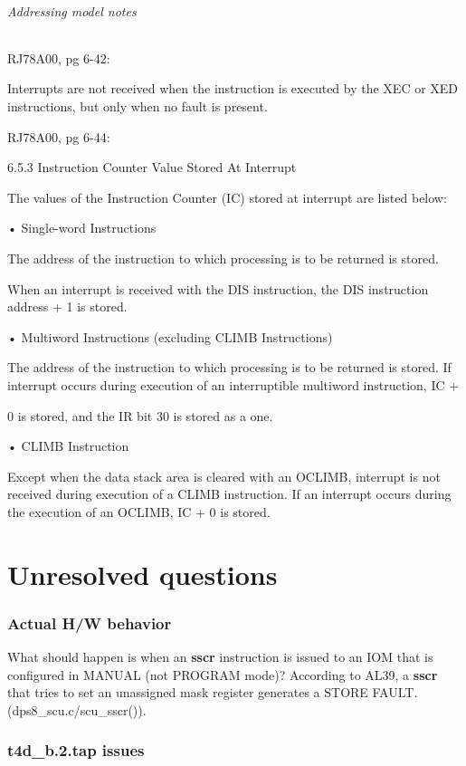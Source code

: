 \documentclass[notitlepage]{report}
\begin{document}
\paragraph{Addressing model notes}

RJ78A00, pg 6-42:

Interrupts are not received when the instruction is executed by the XEC or XED
instructions, but only when no fault is present.

RJ78A00, pg 6-44:

6.5.3 Instruction Counter Value Stored At Interrupt

The values of the Instruction Counter (IC) stored at interrupt are listed below: 

• Single-word Instructions

The address of the instruction to which processing is to be returned is stored.

When an interrupt is received with the DIS instruction, the DIS instruction
address + 1 is stored.

• Multiword Instructions (excluding CLIMB Instructions)

The address of the instruction to which processing is to be returned is stored. If
interrupt occurs during execution of an interruptible multiword instruction, IC +

0 is stored, and the IR bit 30 is stored as a one.

• CLIMB Instruction

Except when the data stack area is cleared with an OCLIMB, interrupt is not
received during execution of a CLIMB instruction. If an interrupt occurs
during the execution of an OCLIMB, IC + 0 is stored.
\part {Unresolved questions}

\section {Actual H/W behavior}

What should happen is when an \textbf{sscr} instruction is issued to an IOM 
that is configured in MANUAL (not PROGRAM mode)? According to AL39, a
 \textbf{sscr} that tries 
to set an unassigned mask register generates a STORE FAULT.
 (dps8\_scu.c/scu\_sscr()).

\section {t4d\_b.2.tap issues}
\end{document}
